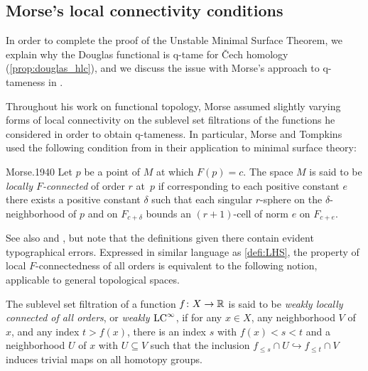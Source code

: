 \subsection{Morse's local connectivity conditions}\label{subsec:historic_hlc}
In order to complete the proof of the Unstable Minimal Surface Theorem, we explain why the Douglas functional is q-tame for \v{C}ech homology (\cref{prop:douglas_hlc}), and we discuss the issue with Morse's approach to q-tameness in \cite[Theorem 6.3]{Morse.1940}.

Throughout his work on functional topology, Morse assumed slightly varying forms of local connectivity on the sublevel set filtrations of the functions he considered in order to obtain \mbox{q-tameness}.
In particular, Morse and Tompkins used the following condition from \cite{Morse.1938,Morse.1940} in their application to minimal surface theory:
\begin{displaycquote}[p.~431]{Morse.1940}
	Let $p$ be a point of $M$ at which $F(p)=c$.
	The space $M$ is said to be \emph{locally $F$-connected} of order $r$ at~$p$ if corresponding to each positive constant $e$ there exists a positive constant $\delta$ such that each singular $r$-sphere on the $\delta$-neighborhood of $p$ and on $F_{c+\delta}$ bounds an $(r+1)$-cell of norm $e$ on $F_{c+e}$.
\end{displaycquote}
See also \cite[p.~ 25]{Morse.1938} and \cite[p.~464]{Morse.1939}, but note that the definitions given there contain evident typographical errors.
Expressed in similar language as \cref{defi:LHS}, the property of local $F$-connectedness of all orders is equivalent to the following notion, applicable to general topological spaces.

\begin{defi}
	The sublevel set filtration of a function $f \colon X \to \mathbb{R}$ is said to be \emph{weakly locally connected of all orders}, or \emph{weakly $\mathrm{LC}^\infty$}, if for any $x \in X$, any neighborhood $V$ of $x$, and any index $t > f(x)$, there is an index $s$ with $f(x) < s < t$ and a neighborhood $U$ of $x$ with $U \subseteq V$ such that the inclusion $f_{\leq s} \cap U \hookrightarrow f_{\leq t} \cap V$ induces trivial maps on all homotopy groups.
\end{defi}

